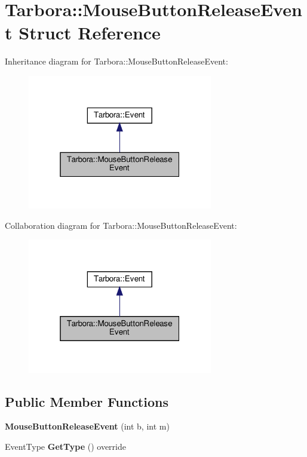 \hypertarget{structTarbora_1_1MouseButtonReleaseEvent}{}\section{Tarbora\+:\+:Mouse\+Button\+Release\+Event Struct Reference}
\label{structTarbora_1_1MouseButtonReleaseEvent}


Inheritance diagram for Tarbora\+:\+:Mouse\+Button\+Release\+Event\+:\nopagebreak
\begin{figure}[H]
\begin{center}
\leavevmode
\includegraphics[width=229pt]{structTarbora_1_1MouseButtonReleaseEvent__inherit__graph}
\end{center}
\end{figure}


Collaboration diagram for Tarbora\+:\+:Mouse\+Button\+Release\+Event\+:\nopagebreak
\begin{figure}[H]
\begin{center}
\leavevmode
\includegraphics[width=229pt]{structTarbora_1_1MouseButtonReleaseEvent__coll__graph}
\end{center}
\end{figure}
\subsection*{Public Member Functions}
\begin{DoxyCompactItemize}
\item 
\mbox{\label{structTarbora_1_1MouseButtonReleaseEvent_a72b893b53ecabf85635b83e7a8ed7577}} 
{\bfseries Mouse\+Button\+Release\+Event} (int b, int m)
\item 
\mbox{\label{structTarbora_1_1MouseButtonReleaseEvent_af9f42cf88759df7ee66240eeb071998a}} 
Event\+Type {\bfseries Get\+Type} () override
\end{DoxyCompactItemize}
